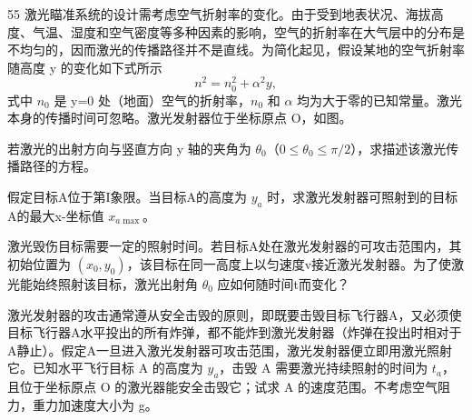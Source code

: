 \begin{problem}[第32届全国中学生物理竞赛决赛]{55}
激光瞄准系统的设计需考虑空气折射率的变化。由于受到地表状况、海拔高度、气温、湿度和空气密度等多种因素的影响，空气的折射率在大气层中的分布是不均匀的，因而激光的传播路径并不是直线。为简化起见，假设某地的空气折射率随高度 y 的变化如下式所示
\begin{equation}
n^{2} = n_{0}^{2} + \alpha^{2} y,
\end{equation}
式中 $n_{0}$ 是 y=0 处（地面）空气的折射率，$n_{0}$ 和 $\alpha$ 均为大于零的已知常量。激光本身的传播时间可忽略。激光发射器位于坐标原点 O，如图。
\begin{subproblem}
若激光的出射方向与竖直方向 y 轴的夹角为 $\theta_{0}$（$0 \leq \theta_{0} \leq \pi/2$），求描述该激光传播路径的方程。
\end{subproblem}
\begin{subproblem}
假定目标A位于第I象限。当目标A的高度为 $y_{a}$ 时，求激光发射器可照射到的目标A的最大x-坐标值 $x_{a\max}$。
\end{subproblem}
\begin{subproblem}
激光毁伤目标需要一定的照射时间。若目标A处在激光发射器的可攻击范围内，其初始位置为 $(x_{0},y_{0})$，该目标在同一高度上以匀速度v接近激光发射器。为了使激光能始终照射该目标，激光出射角 $\theta_{0}$ 应如何随时间t而变化？
\end{subproblem}
\begin{subproblem}
激光发射器的攻击通常遵从安全击毁的原则，即既要击毁目标飞行器A，又必须使目标飞行器A水平投出的所有炸弹，都不能炸到激光发射器（炸弹在投出时相对于A静止）。假定A一旦进入激光发射器可攻击范围，激光发射器便立即用激光照射它。已知水平飞行目标 A 的高度为 $y_{a}$，击毁 A 需要激光持续照射的时间为 $t_{a}$，且位于坐标原点 O 的激光器能安全击毁它；试求 A 的速度范围。不考虑空气阻力，重力加速度大小为 g。
\end{subproblem}
\end{problem}